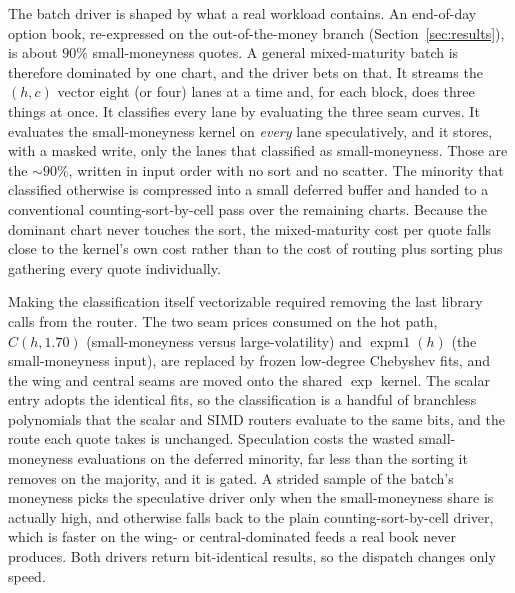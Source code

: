 \documentclass[11pt]{article}
\newcommand{\expmone}{\operatorname{expm1}}
\begin{document}
The batch driver is shaped by what a real workload contains. An end-of-day option book, re-expressed on the out-of-the-money branch (Section~\ref{sec:results}), is about $90\%$ small-moneyness quotes. A general mixed-maturity batch is therefore dominated by one chart, and the driver bets on that. It streams the $(h,c)$ vector eight (or four) lanes at a time and, for each block, does three things at once. It classifies every lane by evaluating the three seam curves. It evaluates the small-moneyness kernel on \emph{every} lane speculatively, and it stores, with a masked write, only the lanes that classified as small-moneyness. Those are the $\sim\!90\%$, written in input order with no sort and no scatter. The minority that classified otherwise is compressed into a small deferred buffer and handed to a conventional counting-sort-by-cell pass over the remaining charts. Because the dominant chart never touches the sort, the mixed-maturity cost per quote falls close to the kernel's own cost rather than to the cost of routing plus sorting plus gathering every quote individually.

Making the classification itself vectorizable required removing the last library calls from the router. The two seam prices consumed on the hot path, $C(h,1.70)$ (small-moneyness versus large-volatility) and $\expmone(h)$ (the small-moneyness input), are replaced by frozen low-degree Chebyshev fits, and the wing and central seams are moved onto the shared $\exp$ kernel. The scalar entry adopts the identical fits, so the classification is a handful of branchless polynomials that the scalar and SIMD routers evaluate to the same bits, and the route each quote takes is unchanged. Speculation costs the wasted small-moneyness evaluations on the deferred minority, far less than the sorting it removes on the majority, and it is gated. A strided sample of the batch's moneyness picks the speculative driver only when the small-moneyness share is actually high, and otherwise falls back to the plain counting-sort-by-cell driver, which is faster on the wing- or central-dominated feeds a real book never produces. Both drivers return bit-identical results, so the dispatch changes only speed.
\end{document}
